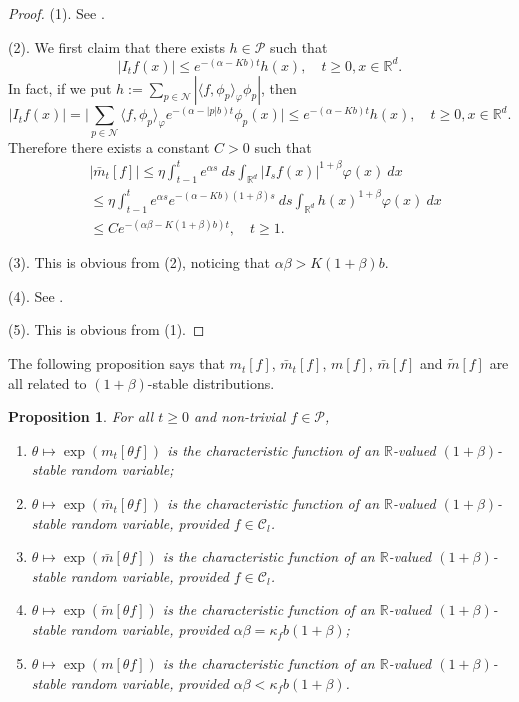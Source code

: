 \documentclass[12pt,a4paper]{amsart}
\theoremstyle{plain}
\newtheorem{prop}[thm]{Proposition}
\theoremstyle{definition}
\numberwithin{equation}{section}
\begin{document}
\begin{proof}
    (1). See \cite[Lemma 2.7]{MarksMilos2018CLT}.

    (2). We first claim that there exists $h\in \mathcal{P}$ such that
\[
    \label{ineq: control of Itg}
    |I_tf(x)|
    \leq e^{-(\alpha-Kb)t}h(x),
    \quad t\geq 0, x\in \mathbb{R}^d.
\]
    In fact, if we put $h:= \sum_{p\in \mathcal N} |\langle f,\phi_p\rangle_{\varphi}\phi_p|$, then
\begin{equation}
\label{eq: supper for Itf}
    |I_tf(x)|
    =\Big|\sum_{p\in\mathcal{N}} \langle f,\phi_p\rangle_{\varphi} e^{-(\alpha-|p|b)t}\phi_p(x)\Big|
    \leq e^{-(\alpha-Kb)t}h(x),
    \quad t\geq 0,x\in \mathbb{R}^d.
\end{equation}
    Therefore there exists a constant $C>0$ such that
\begin{align}
     &|\bar{m}_t[f]|
    \leq \eta \int_{t-1}^{t} e^{\alpha s}~ds \int_{\mathbb R^d} | I_sf(x)|^{1+\beta}\varphi(x)~dx
    \\&\leq \eta \int_{t-1}^{t} e^{\alpha s}e^{-(\alpha-Kb)(1+\beta)s}~ds\int_{\mathbb R^d} h(x)^{1+\beta}\varphi(x)~dx
    \\&\leq C e^{-(\alpha\beta-K(1+\beta)b)t},
    \quad t\geq 1.
\end{align}

    (3). This is obvious from (2), noticing that $\alpha\beta>K(1+\beta)b$.

    (4). See \cite[Lemma 4.2]{MarksMilos2018CLT}.

    (5). This is obvious from (1).
\end{proof}
    The following proposition says that $m_t[f]$, $\bar m_t[f]$, $m[f]$, $\bar m[f]$ and 
    $\widetilde m[f]$ 
    are all related to $(1+\beta)$-stable distributions.
\begin{prop}
\label{prop: alpha stable rv}
	For all $t\geq 0$ and non-trivial $f\in \mathcal P$,
\begin{enumerate}
\item
\label{item: stable 1}
    $\theta \mapsto \exp(m_t[\theta f])$ is the characteristic function of an $\mathbb R$-valued $(1+\beta)$-stable random variable;
\item
\label{item: stable 2}
    $\theta \mapsto \exp(\bar{m}_t[\theta f])$ is the characteristic function of an $\mathbb R$-valued $(1+\beta)$-stable random variable, provided $f \in \mathcal C_l$.
\item
\label{item: stable 3}
   $\theta \mapsto \exp(\bar m[\theta f])$
    is the characteristic function of an $\mathbb R$-valued $(1+\beta)$-stable random variable, provided $f \in \mathcal C_l$.
\item
\label{item: stable 4}
    $\theta \mapsto \exp(\widetilde m[\theta f])$ is the characteristic function of an $\mathbb R$-valued $(1+\beta)$-stable random variable, provided $\alpha\beta=\kappa_f b(1+\beta)$;
\item
\label{item: stable 5}
    $\theta \mapsto \exp(m[\theta f])$ is the characteristic function of an $\mathbb R$-valued $(1+\beta)$-stable random variable, provided $\alpha\beta < \kappa_f b(1+\beta)$.
\end{enumerate}
\end{prop}
\end{document}
